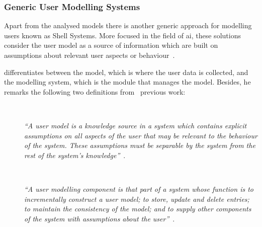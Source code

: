 
\subsubsection{Generic User Modelling Systems}
\label{sec:generic_users}

Apart from the analysed models there is another generic approach for modelling 
users known as Shell Systems. More focused in the field of \ac{ai}, these 
solutions consider the user model as a source of information which are built on 
assumptions about relevant user aspects or 
behaviour~\citep{pohl_logic_based_1999}.

\citet{heckmann_ubiquitous_2005} differentiates between the model, which is where 
the user data is collected, and the modelling system, which is the module that
manages the model. Besides, he remarks the following two definitions
from~\citet{wahlster_user_1989} previous work:

\begin{description}
  \item[] \hfill \\
  \begin{mdframed}[hidealllines=true,backgroundcolor=gray!20]
  \textit{``A user model is a knowledge source in a system which contains explicit
  assumptions on all aspects of the user that may be relevant to the behaviour
  of the system. These assumptions must be separable by the system from the
  rest of the system's knowledge''}~\citep{wahlster_user_1989}.
  \end{mdframed}

  \item[] \hfill \\
  \begin{mdframed}[hidealllines=true,backgroundcolor=gray!20]
  \textit{``A user modelling component is that part of a system whose function is to
  incrementally construct a user model; to store, update and delete entries;
  to maintain the consistency of the model; and to supply other components of
  the system with assumptions about the user''}~\citep{wahlster_user_1989}.
  \end{mdframed}
  
\end{description}


